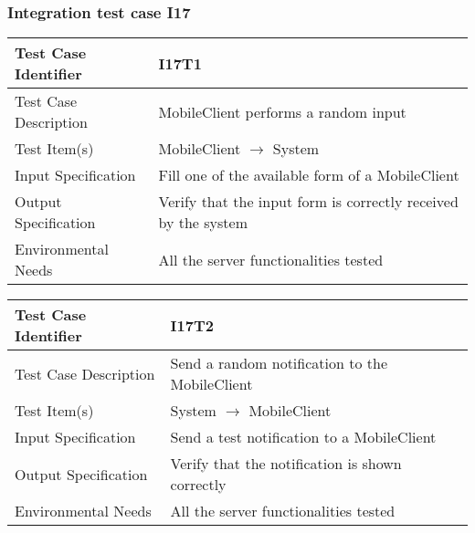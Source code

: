 		\subsubsection{Integration test case I17}
		\begin{center}
			\begin{tabular}{ |l p{10cm}| } \hline
				Test Case Identifier & I17T1 \\ \hline
				Test Case Description & MobileClient performs a random input \\ \hline
				Test Item(s) & MobileClient $\rightarrow$ System \\ \hline
				Input Specification & Fill one of the available form of a MobileClient \\ \hline
				Output Specification & Verify that the input form is correctly received by the system \\ \hline
				Environmental Needs & All the server functionalities tested \\ \hline
			\end{tabular}
		\end{center}
		\begin{center}
			\begin{tabular}{ |l p{10cm}| } \hline
				Test Case Identifier & I17T2 \\ \hline
				Test Case Description & Send a random notification to the MobileClient \\ \hline
				Test Item(s) & System $\rightarrow$ MobileClient \\ \hline
				Input Specification & Send a test notification to a MobileClient \\ \hline
				Output Specification & Verify that the notification is shown correctly \\ \hline
				Environmental Needs & All the server functionalities tested \\ \hline
			\end{tabular}
		\end{center}

